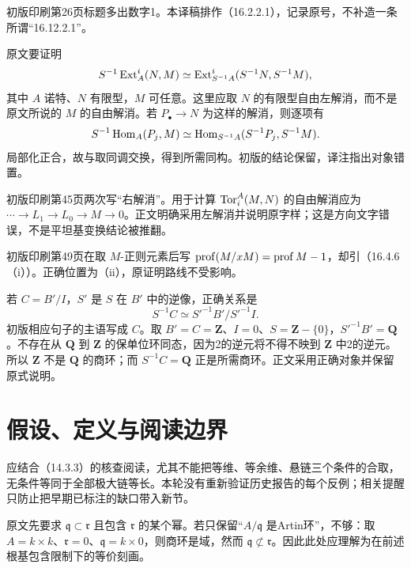 初版印刷第26页标题多出数字1。本译稿排作（16.2.2.1），记录原号，不补造一条所谓“16.12.2.1”。

原文要证明
\[
 S^{-1}\operatorname{Ext}_A^i(N,M)\simeq
 \operatorname{Ext}_{S^{-1}A}^i(S^{-1}N,S^{-1}M),
\]
其中 $A$ 诺特、$N$ 有限型，$M$ 可任意。这里应取 $N$ 的有限型自由左解消，而不是原文所说的 $M$ 的自由解消。若 $P_\bullet\to N$ 为这样的解消，则逐项有
\[
 S^{-1}\operatorname{Hom}_A(P_j,M)
 \simeq\operatorname{Hom}_{S^{-1}A}(S^{-1}P_j,S^{-1}M).
\]
局部化正合，故与取同调交换，得到所需同构。初版的结论保留，译注指出对象错置。

初版印刷第45页两次写“右解消”。用于计算 $\operatorname{Tor}_i^A(M,N)$ 的自由解消应为
$\cdots\to L_1\to L_0\to M\to0$。正文明确采用左解消并说明原字样；这是方向文字错误，不是平坦基变换结论被推翻。

初版印刷第49页在取 $M$-正则元素后写 $\operatorname{prof}(M/xM)=\operatorname{prof} M-1$，却引（16.4.6（i））。正确位置为（ii），原证明路线不受影响。

若 $C=B'/I$，$S'$ 是 $S$ 在 $B'$ 中的逆像，正确关系是
\[
 S^{-1}C\simeq S'^{-1}B'/S'^{-1}I.
\]
初版相应句子的主语写成 $C$。取 $B'=C=\mathbf Z$、$I=0$、$S=\mathbf Z-\{0\}$，$S'^{-1}B'=\mathbf Q$。不存在从 $\mathbf Q$ 到 $\mathbf Z$ 的保单位环同态，因为2的逆元将不得不映到 $\mathbf Z$ 中2的逆元。所以 $\mathbf Z$ 不是 $\mathbf Q$ 的商环；而 $S^{-1}C=\mathbf Q$ 正是所需商环。正文采用正确对象并保留原式说明。

\section{假设、定义与阅读边界}
应结合（14.3.3）的核查阅读，尤其不能把等维、等余维、悬链三个条件的合取，无条件等同于全部极大链等长。本轮没有重新验证历史报告的每个反例；相关提醒只防止把早期已标注的缺口带入新节。

原文先要求 $\mathfrak q\subset\mathfrak r$ 且包含 $\mathfrak r$ 的某个幂。若只保留“$A/\mathfrak q$ 是Artin环”，不够：取
$A=k\times k$、$\mathfrak r=0$、$\mathfrak q=k\times0$，则商环是域，然而 $\mathfrak q\not\subset\mathfrak r$。因此此处应理解为在前述根基包含限制下的等价刻画。

